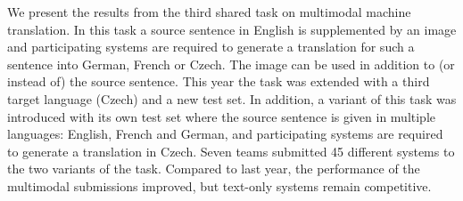 We present the results from the third shared task on multimodal machine translation. In this task a source sentence in English is supplemented by an image and participating systems are required to generate a translation for such a sentence into German, French or Czech. The image can be used in addition to (or instead of) the source sentence. This year the task was extended with a third target language (Czech) and a new test set. In addition, a variant of this task was introduced with its own test set where the source sentence is given in multiple languages: English, French and German, and participating systems are required to generate a translation in Czech. Seven teams submitted 45 different systems to the two variants of the task. Compared to last year, the performance of the multimodal submissions improved, but text-only systems remain competitive.
